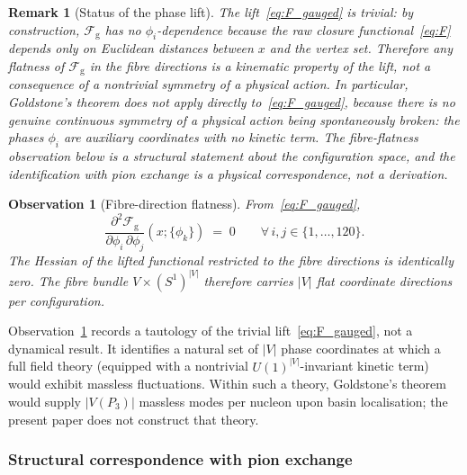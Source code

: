 \documentclass[12pt]{article}
\newtheorem{remark}[theorem]{Remark}
\newtheorem{observation}[theorem]{Observation}
\newcommand{\Fcal}{\mathcal{F}}
\begin{document}
\begin{remark}[Status of the phase lift]\label{rem:phase_lift_status}
The lift~\eqref{eq:F_gauged} is \textit{trivial}: by construction,
$\Fcal_{\mathrm{g}}$ has no $\phi_i$-dependence because the raw closure
functional~\eqref{eq:F} depends only on Euclidean distances between
$x$ and the vertex set. Therefore any flatness of
$\Fcal_{\mathrm{g}}$ in the fibre directions is a kinematic property
of the lift, not a consequence of a nontrivial symmetry of a
physical action. In particular, Goldstone's theorem does not apply
directly to~\eqref{eq:F_gauged}, because there is no genuine
continuous symmetry of a physical action being spontaneously
broken: the phases $\phi_i$ are auxiliary coordinates with no
kinetic term. The fibre-flatness observation below is a structural
statement about the configuration space, and the identification with
pion exchange is a physical correspondence, not a derivation.
\end{remark}

\begin{observation}[Fibre-direction flatness]\label{obs:fibre_flat}
From~\eqref{eq:F_gauged},
\begin{equation}\label{eq:hess_zero}
    \frac{\partial^2 \Fcal_{\mathrm{g}}}{\partial \phi_i\,\partial \phi_j}(x; \{\phi_k\}) \;=\; 0
    \qquad \forall\, i, j \in \{1,\ldots,120\}.
\end{equation}
The Hessian of the lifted functional restricted to the fibre
directions is identically zero. The fibre bundle
$V \times (S^1)^{|V|}$ therefore carries $|V|$ flat coordinate
directions per configuration.
\end{observation}

Observation~\ref{obs:fibre_flat} records a tautology of the trivial
lift~\eqref{eq:F_gauged}, not a dynamical result. It identifies a
natural set of $|V|$ phase coordinates at which a full field theory
(equipped with a nontrivial $U(1)^{|V|}$-invariant kinetic term)
would exhibit massless fluctuations. Within such a theory,
Goldstone's theorem would supply $|V(P_3)|$ massless modes per
nucleon upon basin localisation; the present paper does not
construct that theory.

\subsubsection*{Structural correspondence with pion exchange}
\end{document}
